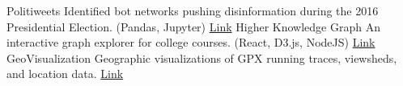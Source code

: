 	\begin{projects}
		\project
			{Politiweets}
			{Identified bot networks pushing disinformation during the 2016 Presidential Election. (Pandas, Jupyter)}
			{\href{https://github.com/ryan-p-larson/polititweets}{Link}}
		\project
			{Higher Knowledge Graph}
			{An interactive graph explorer for college courses. (React, D3.js, NodeJS)}
			{\href{https://github.com/ryan-p-larson/higher-knowledge-graph}{Link}}
		\project
			{GeoVisualization}
			{Geographic visualizations of GPX running traces, viewsheds, and location data.}
			{\href{https://github.com/ryan-p-larson/city-maps}{Link}}
	\end{projects}
